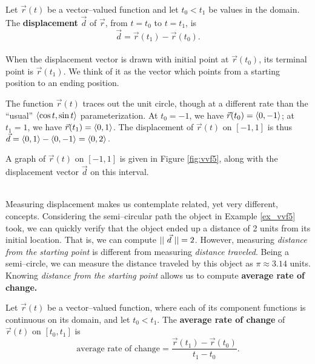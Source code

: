 {Let $\vec r(t)$ be a vector--valued function and let $t_0<t_1$ be values in the domain. The \textbf{displacement} $\vec d$ of $\vec r$, from $t=t_0$ to $t=t_1$, is $$\vec d=\vec r(t_1)-\vec r(t_0).$$
}\\

When the displacement vector is drawn with initial point at $\vec r(t_0)$, its terminal point is $\vec r(t_1)$. We think of it as the vector which points from a starting position to an ending position.\\

{The function $\vec r(t)$ traces out the unit circle, though at a different rate than the ``usual'' $\left\langle \cos t,\sin t\right\rangle$ parameterization. At $t_0=-1$, we have $\vec r(t_0) = \left\langle 0,-1\right\rangle$; at $t_1=1$, we have $\vec r(t_1) = \left\langle 0,1\right\rangle$. The displacement of $\vec r(t)$ on $[-1,1]$ is thus $\vec d = \left\langle 0,1\right\rangle - \left\langle 0,-1\right\rangle = \left\langle 0,2\right\rangle.$

A graph of $\vec r(t)$ on $[-1,1]$ is given in Figure \ref{fig:vvf5}, along with the displacement vector $\vec d$ on this interval.
}\\

Measuring displacement makes us contemplate related, yet very different, concepts. Considering the semi--circular path the object in Example \ref{ex_vvf5} took, we can quickly verify that the object ended up a distance of 2 units from its initial location. That is, we can compute $||\ \vec d\ || = 2$. However, measuring \emph{distance from the starting point} is different from measuring \emph{distance traveled}. Being a semi--circle, we can measure the distance traveled by this object as $\pi\approx 3.14$ units. Knowing \emph{distance from the starting point} allows us to compute \textbf{average rate of change.}

{Let $\vec r(t)$ be a vector--valued function, where each of its component functions is continuous on its domain, and let $t_0<t_1$. The \textbf{average rate of change} of $\vec r(t)$ on $[t_0,t_1]$ is
$$\text{average rate of change} = \frac{\vec r(t_1) - \vec r(t_0)}{t_1-t_0}.$$
}\\


